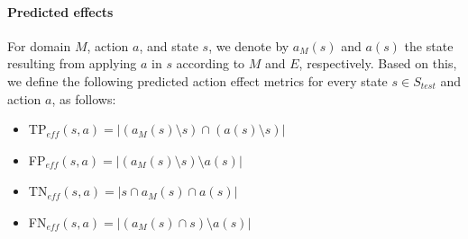 \documentclass{article}
\theoremstyle{definition}
\theoremstyle{remark}
\newcommand{\stest}{\ensuremath{S_{\textit{test}}}\xspace}
\newcommand{\eff}{\ensuremath{\textit{eff}}\xspace}
\begin{document}
\paragraph{Predicted effects}
For domain $M$, action $a$, and state $s$, we denote by $a_M(s)$ and $a(s)$ the state resulting from applying $a$ in $s$ according to $M$ and $E$, respectively. 
Based on this, we define the following predicted action effect metrics for every state $s\in\stest$ and action $a$, as follows: 
\begin{itemize}
    \item TP$_{\eff}(s,a)=|(a_M(s)\setminus s)\cap (a(s)\setminus s)|$
    \item FP$_{\eff}(s,a)=|(a_M(s)\setminus s)\setminus a(s)|$ 
    \item TN$_{\eff}(s,a)=|s \cap a_M(s) \cap a(s)|$
    \item FN$_{\eff}(s,a)=|(a_M(s)\cap s)\setminus a(s)|$ 
\end{itemize}
\end{document}
